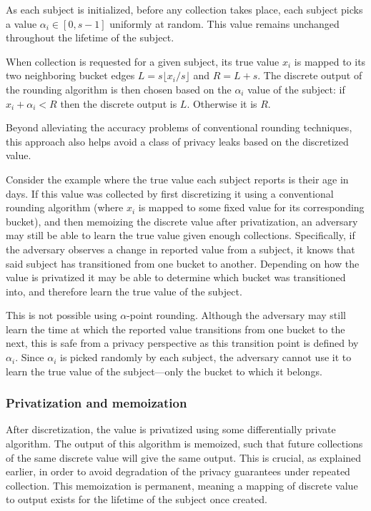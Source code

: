 \documentclass[12pt]{article}
\begin{document}
As each subject is initialized, before any collection takes place, each subject picks a value $\alpha_i \in [0,s-1]$ uniformly at random. This value remains unchanged throughout the lifetime of the subject.

When collection is requested for a given subject, its true value $x_i$ is mapped to its two neighboring bucket edges $L=s \lfloor x_i / s \rfloor$ and $R=L+s$. The discrete output of the rounding algorithm is then chosen based on the $\alpha_i$ value of the subject: if $x_i + \alpha_i < R$ then the discrete output is $L$. Otherwise it is $R$. \bigskip

Beyond alleviating the accuracy problems of conventional rounding techniques, this approach also helps avoid a class of privacy leaks based on the discretized value.

Consider the example where the true value each subject reports is their age in days. If this value was collected by first discretizing it using a conventional rounding algorithm (where $x_i$ is mapped to some fixed value for its corresponding bucket), and then memoizing the discrete value after privatization, an adversary may still be able to learn the true value given enough collections. Specifically, if the adversary observes a change in reported value from a subject, it knows that said subject has transitioned from one bucket to another. Depending on how the value is privatized it may be able to determine which bucket was transitioned into, and therefore learn the true value of the subject.

This is not possible using $\alpha$-point rounding. Although the adversary may still learn the time at which the reported value transitions from one bucket to the next, this is safe from a privacy perspective as this transition point is defined by $\alpha_i$. Since $\alpha_i$ is picked randomly by each subject, the adversary cannot use it to learn the true value of the subject---only the bucket to which it belongs.

\subsubsection{Privatization and memoization}

After discretization, the value is privatized using some differentially private algorithm. The output of this algorithm is memoized, such that future collections of the same discrete value will give the same output. This is crucial, as explained earlier, in order to avoid degradation of the privacy guarantees under repeated collection. This memoization is permanent, meaning a mapping of discrete value to output exists for the lifetime of the subject once created.
\end{document}
